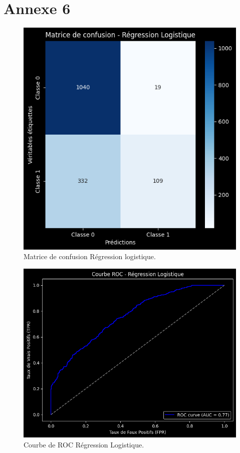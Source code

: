 \section*{Annexe 6}
\label{sec:annexe6}
\begin{figure}[H]
\centering
\includegraphics[width=1\textwidth]{figures/MatriceRL.png}
\caption{Matrice de confusion Régression logistique.}
\label{fig:annexe6}
\end{figure}


\begin{figure}[H]
\centering
\includegraphics[width=1\textwidth]{figures/ROCRL.png}
\caption{Courbe de ROC Régression Logistique.}
\end{figure}

